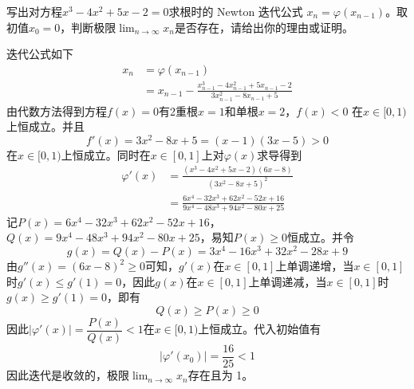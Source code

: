 \documentclass[11pt]{article}
\begin{document}
\begin{question}

    \questiontext
    {
        写出对方程$x^3 - 4x^2 + 5x - 2 =0$求根时的 Newton 迭代公式 $x_n = \varphi(x_{n - 1})$。取初值$x_0 = 0$，判断极限$\displaystyle \lim_{n \rightarrow \infty}{x_n}$是否存在，请给出你的理由或证明。
    }

    \answer
    {
    迭代公式如下
    \begin{align*}
        x_n & = \varphi(x_{n - 1})                                                                            \\
            & = x_{n - 1} - \frac{x_{n - 1}^3 - 4x_{n - 1}^2 + 5x_{n - 1} - 2}{3x_{n - 1}^2 - 8x_{n - 1} + 5}
    \end{align*}
    由代数方法得到方程$f(x) = 0$有2重根$x = 1$和单根$x = 2$，$f(x) < 0$ 在$x \in [0, 1)$上恒成立。并且 $$f'(x) = 3 x^2 - 8 x + 5  = (x-1) (3 x-5) > 0$$ 在$x \in [0, 1)$上恒成立。同时在$x \in [0, 1]$上对$\varphi(x)$求导得到
    \begin{align*}
        \varphi'(x) & = \frac{(x^3 - 4x^2 + 5x - 2)(6x - 8)}{(3x^2 - 8x + 5)^2}         \\
                    & = \frac{6 x^4-32 x^3+62 x^2-52 x+16}{9 x^4-48 x^3+94 x^2-80 x+25}
    \end{align*}
    记$P(x) = 6 x^4-32 x^3+62 x^2-52 x+16$，$Q(x) = 9 x^4-48 x^3+94 x^2-80 x+25$，易知$P(x) \geqslant 0$恒成立。并令
    \begin{equation*}
        g(x) = Q(x) - P(x) = 3 x^4-16 x^3+32 x^2-28 x+9
    \end{equation*}
    由$g''(x) = (6x - 8)^2 \geqslant 0$可知，$g'(x)$在$x \in [0, 1]$上单调递增，当$x \in [0, 1]$时$g'(x) \leqslant g'(1) = 0$，因此$g(x)$在$x \in [0, 1]$上单调递减，当$x \in [0, 1]$时$g(x) \geqslant g'(1) = 0$，即有
    \begin{equation*}
        Q(x) \geqslant P(x) \geqslant 0
    \end{equation*}
    因此$\left|\varphi'(x)\right| = \dfrac{P(x)}{Q(x)} < 1$在$x \in [0, 1)$上恒成立。代入初始值有
    \begin{equation*}
        \left|\varphi'(x_0)\right| = \frac{16}{25} < 1
    \end{equation*}
    因此迭代是收敛的，极限$\displaystyle \lim_{n \rightarrow \infty}{x_n}$存在且为 1。
    }

\end{question}
\end{document}

